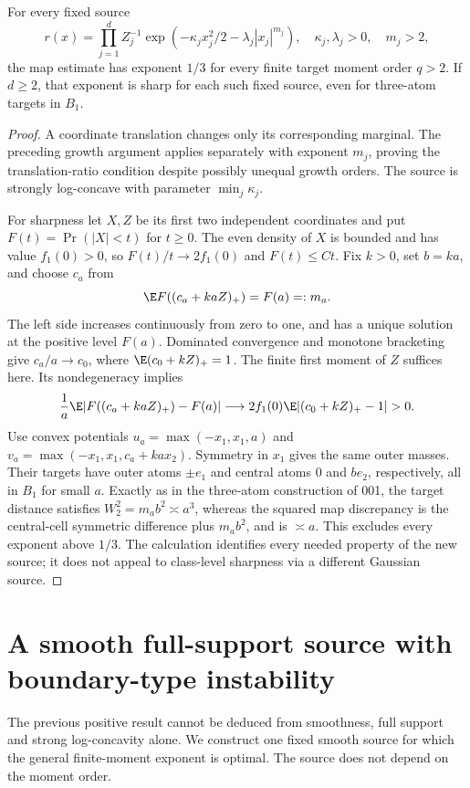 \begin{corollary}\label{cor:product}
For every fixed source
\[
 r(x)=\prod_{j=1}^d Z_j^{-1}
       \exp(-\kappa_jx_j^2/2-\lambda_j|x_j|^{m_j}),
 \quad \kappa_j,\lambda_j>0,\quad m_j>2,
\]
the map estimate has exponent $1/3$ for every finite target moment order $q>2$. If $d\ge2$, that exponent is sharp for each such fixed source, even for three-atom targets in $B_1$.
\end{corollary}
\begin{proof}
A coordinate translation changes only its corresponding marginal. The preceding growth argument applies separately with exponent $m_j$, proving the translation-ratio condition despite possibly unequal growth orders. The source is strongly log-concave with parameter $\min_j\kappa_j$.

For sharpness let $X,Z$ be its first two independent coordinates and put $F(t)=\Pr(|X|<t)$ for $t\ge0$. The even density of $X$ is bounded and has value $f_1(0)>0$, so $F(t)/t\to2f_1(0)$ and $F(t)\le C t$. Fix $k>0$, set $b=ka$, and choose $c_a$ from
\[
 \E F((c_a+kaZ)_+)=F(a)=:m_a.
\]
The left side increases continuously from zero to one, and has a unique solution at the positive level $F(a)$. Dominated convergence and monotone bracketing give $c_a/a\to c_0$, where $\E(c_0+kZ)_+=1$. The finite first moment of $Z$ suffices here. Its nondegeneracy implies
\[
 \frac1a\E|F((c_a+kaZ)_+)-F(a)|
 \longrightarrow2f_1(0)\E|(c_0+kZ)_+-1|>0.
\]
Use convex potentials $u_a=\max(-x_1,x_1,a)$ and
$v_a=\max(-x_1,x_1,c_a+ka x_2)$. Symmetry in $x_1$ gives the same outer masses. Their targets have outer atoms $\pm e_1$ and central atoms $0$ and $be_2$, respectively, all in $B_1$ for small $a$. Exactly as in the three-atom construction of 001, the target distance satisfies $W_2^2=m_ab^2\asymp a^3$, whereas the squared map discrepancy is the central-cell symmetric difference plus $m_ab^2$, and is $\asymp a$. This excludes every exponent above $1/3$. The calculation identifies every needed property of the new source; it does not appeal to class-level sharpness via a different Gaussian source.
\end{proof}

\section{A smooth full-support source with boundary-type instability}\label{sec:steep}
The previous positive result cannot be deduced from smoothness, full support and strong log-concavity alone. We construct one fixed smooth source for which the general finite-moment exponent is optimal. The source does not depend on the moment order.

